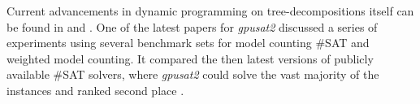 \documentclass[a4paper, 12pt, bibliography=totoc]{scrartcl}
\begin{document}
Current advancements in dynamic programming on tree-decompositions itself can be found in \cite{dpdbpadl2020} and \cite{taminghightw}. One of the latest papers for \textit{gpusat2} discussed a series of experiments using several benchmark sets for model counting \#SAT and weighted model counting. It compared the then latest versions of publicly available \#SAT solvers, where \textit{gpusat2} could solve the vast majority of the instances and ranked second place \cite[Ch. 5]{fichtegpusat2}. 
%

%

\end{document}
